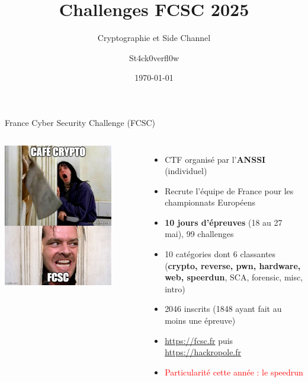 \documentclass[aspectratio=169,xcolor=dvipsnames]{beamer}
\title{Challenges FCSC 2025}
\subtitle{Cryptographie et Side Channel}
\author{St4ck0verfl0w}
\institute
{
	Redacted
}
\date{\today} %
\begin{document}

\begin{frame}
    \titlepage
\end{frame}


\begin{frame}{France Cyber Security Challenge (FCSC)}
    \begin{columns}[c]
            \begin{center}                  
                \includegraphics[width=0.8\textwidth]{img/meme/intro.png}
            \end{center}

           \begin{itemize}
               \item  CTF organisé par l'\textbf{ANSSI} (individuel)
               \item Recrute l'équipe de France pour les championnats Européens
               \pause
               \item \textbf{10 jours d'épreuves} (18 au 27 mai), 99 challenges
                \item 10 catégories dont 6 classantes (\textbf{crypto, reverse, pwn, hardware, web, speerdun}, SCA, forensic, misc, intro)
                \pause
                \item 2046 inscrits (1848 ayant fait au moins une épreuve)
                \item \url{https://fcsc.fr} puis \url{https://hackropole.fr}
                \pause
                \item \textcolor{red}{Particularité cette année : le speedrun}
           \end{itemize}


\end{columns}
\end{frame}
\end{document}
